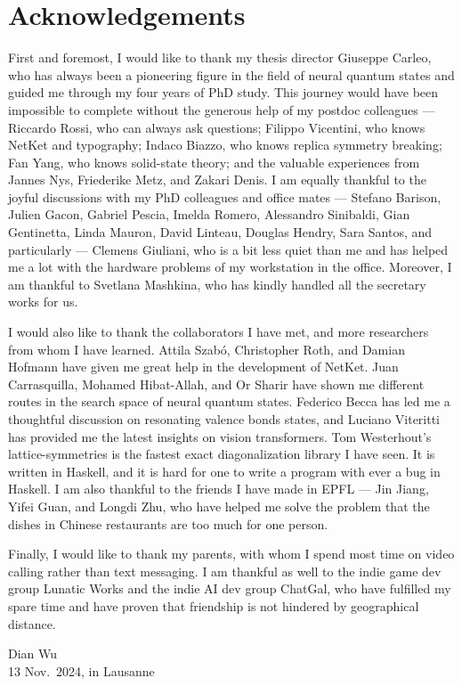 \chapter*{Acknowledgements}

First and foremost, I would like to thank my thesis director Giuseppe Carleo, who has always been a pioneering figure in the field of neural quantum states and guided me through my four years of PhD study.
This journey would have been impossible to complete without the generous help of my postdoc colleagues --- Riccardo Rossi, who can always ask questions; Filippo Vicentini, who knows NetKet and typography; Indaco Biazzo, who knows replica symmetry breaking; Fan Yang, who knows solid-state theory; and the valuable experiences from Jannes Nys, Friederike Metz, and Zakari Denis.
I am equally thankful to the joyful discussions with my PhD colleagues and office mates --- Stefano Barison, Julien Gacon, Gabriel Pescia, Imelda Romero, Alessandro Sinibaldi, Gian Gentinetta, Linda Mauron, David Linteau, Douglas Hendry, Sara Santos, and particularly --- Clemens Giuliani, who is a bit less quiet than me and has helped me a lot with the hardware problems of my workstation in the office.
Moreover, I am thankful to Svetlana Mashkina, who has kindly handled all the secretary works for us.

I would also like to thank the collaborators I have met, and more researchers from whom I have learned.
Attila Szabó, Christopher Roth, and Damian Hofmann have given me great help in the development of NetKet.
Juan Carrasquilla, Mohamed Hibat-Allah, and Or Sharir have shown me different routes in the search space of neural quantum states.
Federico Becca has led me a thoughtful discussion on resonating valence bonds states, and Luciano Viteritti has provided me the latest insights on vision transformers.
Tom Westerhout's lattice-symmetries is the fastest exact diagonalization library I have seen. It is written in Haskell, and it is hard for one to write a program with ever a bug in Haskell.
I am also thankful to the friends I have made in EPFL --- Jin Jiang, Yifei Guan, and Longdi Zhu, who have helped me solve the problem that the dishes in Chinese restaurants are too much for one person.

Finally, I would like to thank my parents, with whom I spend most time on video calling rather than text messaging.
I am thankful as well to the indie game dev group Lunatic Works and the indie AI dev group ChatGal, who have fulfilled my spare time and have proven that friendship is not hindered by geographical distance.

\begin{flushright}
Dian Wu \\
13 Nov.\ 2024, in Lausanne
\end{flushright}

